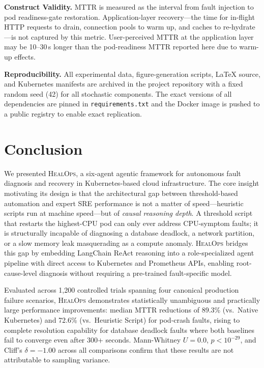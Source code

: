 \documentclass[journal,10pt,twoside]{IEEEtran}
\newcommand{\HealOps}{\textsc{HealOps}}
\begin{document}
\textbf{Construct Validity.}
MTTR is measured as the interval from fault injection to pod readiness-gate
restoration. Application-layer recovery---the time for in-flight HTTP
requests to drain, connection pools to warm up, and caches to
re-hydrate---is not captured by this metric. User-perceived MTTR at the
application layer may be 10--30\,s longer than the pod-readiness MTTR
reported here due to warm-up effects.

\textbf{Reproducibility.}
All experimental data, figure-generation scripts, LaTeX source, and
Kubernetes manifests are archived in the project repository with a fixed
random seed (42) for all stochastic components. The exact versions of
all dependencies are pinned in \texttt{requirements.txt} and the Docker
image is pushed to a public registry to enable exact replication.

\section{Conclusion}\label{sec:conclusion}

We presented \HealOps{}, a six-agent agentic framework for autonomous
fault diagnosis and recovery in Kubernetes-based cloud infrastructure.
The core insight motivating its design is that the architectural gap
between threshold-based automation and expert SRE performance is not
a matter of speed---heuristic scripts run at machine speed---but of
\emph{causal reasoning depth}. A threshold script that restarts the
highest-CPU pod can only ever address CPU-symptom faults; it is
structurally incapable of diagnosing a database deadlock, a network
partition, or a slow memory leak masquerading as a compute anomaly.
\HealOps{} bridges this gap by embedding LangChain ReAct reasoning into
a role-specialized agent pipeline with direct access to Kubernetes and
Prometheus APIs, enabling root-cause-level diagnosis without requiring
a pre-trained fault-specific model.

Evaluated across 1{,}200 controlled trials spanning four canonical
production failure scenarios, \HealOps{} demonstrates statistically
unambiguous and practically large performance improvements: median MTTR
reductions of 89.3\% (vs.\ Native Kubernetes) and 72.6\% (vs.\ Heuristic
Script) for pod-crash faults, rising to complete resolution capability
for database deadlock faults where both baselines fail to converge even
after 300+ seconds. Mann-Whitney $U = 0.0$, $p < 10^{-29}$, and Cliff's
$\delta = -1.00$ across all comparisons confirm that these results are
not attributable to sampling variance.
\end{document}
